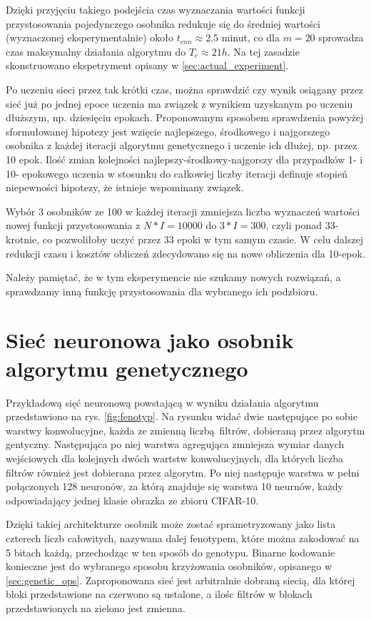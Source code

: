 Dzięki przyjęciu takiego podejścia czas wyznaczania wartości funkcji przystosowania pojedynczego osobnika redukuje się do średniej wartości (wyznaczonej eksperymentalnie) około $t_{cnn} \approx 2.5 $ minut, co dla $m = 20$ sprowadza czas maksymalny działania algorytmu do $T_c \approx 21 h$.
Na tej zasadzie skonstruowano ekspetryment opisany w \ref{sec:actual_experiment}.

Po uczeniu sieci przez tak krótki czas, można sprawdzić czy wynik osiągany przez sieć już po jednej epoce uczenia ma związek z wynikiem uzyskanym po uczeniu dłuższym, np. dziesięciu epokach.
Proponowanym sposobem sprawdzenia powyżej sformułowanej hipotezy jest wzięcie najlepszego, środkowego i najgorszego osobnika z każdej iteracji algorytmu genetycznego i uczenie ich dłużej, np. przez 10 epok.
Ilość zmian kolejności najlepszy-środkowy-najgorszy dla przypadków 1- i 10- epokowego uczenia w stosunku do całkowiej liczby iteracji definuje stopień niepewności hipotezy, że istnieje wspominany związek.

Wybór 3 osobników ze 100 w każdej iteracji zmniejsza liczba wyznaczeń wartości nowej funkcji przystosowania z $N*I = 10000$ do $3*I = 300$, czyli ponad 33-krotnie, co pozwoliłoby uczyć przez 33 epoki w tym samym czasie.
W celu dalszej redukcji czasu i kosztów obliczeń zdecydowano się na nowe obliczenia dla 10-epok.

Należy pamiętać, że w tym eksperymencie nie szukamy nowych rozwiązań, a sprawdzamy inną funkcję przystosowania dla wybranego ich podzbioru.

\section{Sieć neuronowa jako osobnik algorytmu genetycznego}\label{sec:fenotyp}

Przykładową sięć neuronową powstającą w wyniku działania algorytmu przedstawiono na rys. \ref{fig:fenotyp}.
Na rysunku widać dwie następujące po sobie warstwy konwolucyjne, każda ze zmienną liczbą filtrów, dobieraną przez algorytm gentyczny.
Następująca po niej warstwa agregująca zmniejsza wymiar danych wejściowych dla kolejnych dwóch wartstw konwolucyjnych, dla których liczba filtrów również jest dobierana przez algorytm.
Po niej następuje warstwa w pełni połączonych 128 neuronów, za którą znajduje się warstwa 10 neurnów, każdy odpowiadający jednej klasie obrazka ze zbioru CIFAR-10.

Dzięki takiej architekturze osobnik może zostać sprametryzowany jako lista czterech liczb całowitych, nazywana dalej fenotypem, które można zakodować na 5 bitach każdą, przechodząc w ten sposób do genotypu.
Binarne kodowanie konieczne jest do wybranego sposobu krzyżowania osobników, opisanego w \ref{sec:genetic_ops}.
Zaproponowana sieć jest arbitralnie dobraną siecią, dla której bloki przedstawione na czerwono są ustalone, a ilośc filtrów w blokach przedstawionych na zielono jest zmienna.

